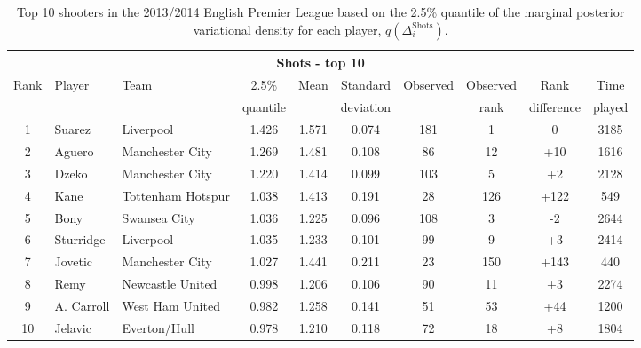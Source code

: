 \documentclass[11pt,a4paper]{article}
\begin{document}
\begin{table}%
\caption{Top 10 shooters in the 2013/2014 English Premier League based on the 2.5\% quantile of the marginal posterior variational density for each player, $q(\Delta_i^{\textrm{Shots}})$.} \label{tableshots}
\centering
\footnotesize
\begin{tabular}{cllccccccc}
\hline
\multicolumn{10}{c}{Shots - top 10}\\
\hline
\multirow{2}{*}{Rank} & \multirow{2}{*}{Player} &  \multirow{2}{*}{Team} & 2.5\% & \multirow{2}{*}{Mean} & Standard & \multirow{2}{*}{Observed} & Observed & Rank & Time\\
 &  &  & quantile & & deviation &  & rank & difference & played \\
\hline
1 & Suarez 	& Liverpool &	1.426  	&	1.571  	&	0.074 	& 	181 &  1	& 0 & 3185\\ 	
2 & Aguero 	& Manchester City	& 	1.269 	& 	1.481 	& 	0.108 	& 	86 	 & 12 & +10 & 1616\\
3 & Dzeko   &	Manchester City &	1.220 	& 	1.414 	& 	0.099 	& 	103 	 &  5	& +2 & 2128\\
4 & Kane 	 & Tottenham Hotspur	& 	1.038 	& 	1.413 	& 	0.191 	& 	28 	 &  126	& +122 & 549 \\
5 & Bony 	& Swansea City	& 	1.036 	& 	1.225 	& 	0.096 	& 	108 	 & 3 	& -2 & 2644 \\
6 & Sturridge & Liverpool	& 	1.035 	& 	1.233 	& 	0.101 	& 	99 	 &  9	& +3 & 2414\\
7 & Jovetic 	& Manchester City	& 	1.027 	& 	1.441 	& 	0.211 	& 	23 	 & 150 	& +143 & 440\\
8 & Remy 	& Newcastle United	& 	0.998 	& 	1.206 	& 	0.106 	& 	90 	 &  11	& +3 & 2274 \\
9 & A. Carroll 	& West Ham United 	&	0.982 	& 	1.258 	& 	0.141 	& 	51 	 & 53	& +44 & 1200\\
10 & Jelavic & Everton/Hull	& 	 	0.978 	& 	1.210 	&  	0.118 	&  	72 & 18	& +8 & 1804\\
\hline
\end{tabular}
\end{table}
\end{document}
